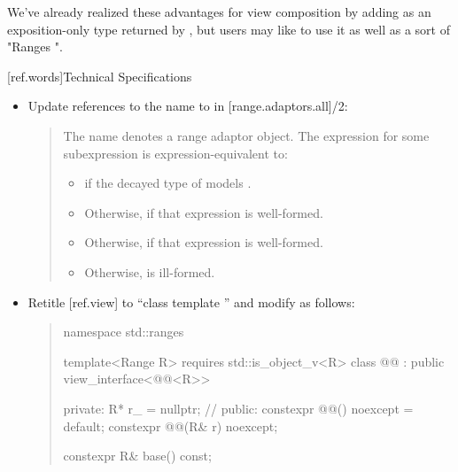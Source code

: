 We've already realized these advantages for view composition by adding
 as an exposition-only  type returned
by , but users may like to use it as well as a sort of "Ranges
".

[ref.words]{Technical Specifications}

\begin{itemize}
\item Update references to the name  to
   in [range.adaptors.all]/2:
  \begin{quote}
\setcounter{Paras}{1}
\pnum
The name  denotes a range adaptor
object. The expression  for
some subexpression  is expression-equivalent to:

\begin{itemize}
\item {} if the decayed type of 
models .

\item Otherwise,
 if that
expression is well-formed.

\item Otherwise,  if that expression is well-formed.

\item Otherwise,  is ill-formed.
\end{itemize}

  \end{quote}
\item Retitle [ref.view] to ``class template '' and modify as
  follows:
  \begin{quote}
\begin{codeblock}
namespace std::ranges {
  template<Range R>
    requires std::is_object_v<R>
  class @@ : public view_interface<@@<R>> {
  private:
    R* r_ = nullptr; // \expos
  public:
    constexpr @@() noexcept = default;
    constexpr @@(R& r) noexcept;

    constexpr R& base() const;

}}
\end{codeblock}
\end{quote}
\end{itemize}
